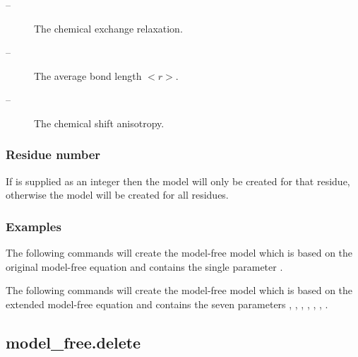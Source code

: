 \begin{description}
\item[ --]  The chemical exchange relaxation. 
\item[ --]    The average bond length $<$$r$$>$. 
\item[ --]  The chemical shift anisotropy. 
\end{description}



\subsubsection{Residue number}

If  is supplied as an integer then the model will only be created for that residue, otherwise the model will be created for all residues.



\subsubsection{Examples}

The following commands will create the model-free model  which is based on the original model-free equation and contains the single parameter .




The following commands will create the model-free model  which is based on the extended model-free equation and contains the seven parameters , , , , , , .






\newpage

\subsection{model\_free.delete}


